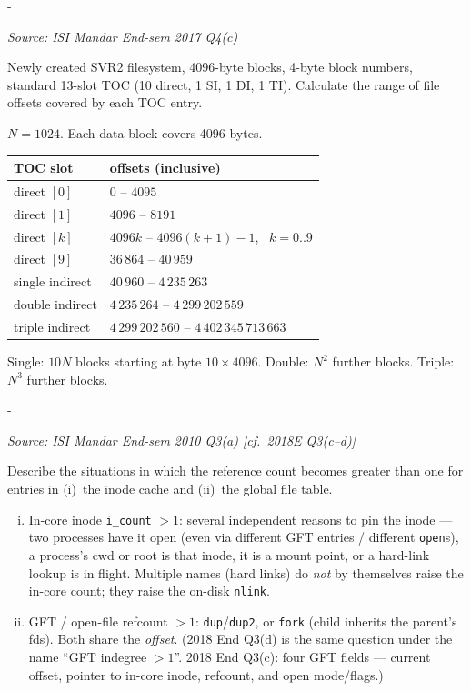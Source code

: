 \documentclass[11pt,a4paper]{article}
\makeatletter
\newcommand{\keepspace}[1]{\par\penalty-100\begingroup
  \setlength{\dimen@}{#1}\dimen@ii\pagegoal\advance\dimen@ii-\pagetotal
  \ifdim\dimen@>\dimen@ii\ifdim\dimen@ii>\z@\vfil\fi\break\fi\endgroup}
\newcounter{qn}[section]
\newenvironment{Qn}[4]{%
  \refstepcounter{qn}\keepspace{7\baselineskip}%
  \begin{tcolorbox}[qboxstyle, title={Q\thesection.\theqn\ \ [#1 \textbar\ #2]\ \ #4}]%
  {\footnotesize\color{g3}\textit{Source: #3}}\par\smallskip%
}{%
  \end{tcolorbox}%
}
\newenvironment{Sol}{%
  \begin{tcolorbox}[sboxstyle, title={Solution}]%
}{%
  \end{tcolorbox}\vspace{0.35em}%
}
\makeatother
\begin{document}
\begin{Qn}{Hard}{Lect 24}{ISI Mandar End-sem 2017 Q4(c)}{Offset ranges of each TOC entry}
Newly created SVR2 filesystem, 4096-byte blocks, 4-byte block numbers,
standard 13-slot TOC (10 direct, 1 SI, 1 DI, 1 TI). Calculate the range
of file offsets covered by each TOC entry.
\end{Qn}
\begin{Sol}
$N=1024$. Each data block covers 4096 bytes.
\begin{center}
\begin{tabular}{ll}
\hline
TOC slot & offsets (inclusive) \\
\hline
direct $[0]$ & $0$ -- $4095$ \\
direct $[1]$ & $4096$ -- $8191$ \\
direct $[k]$ & $4096k$ -- $4096(k+1)-1$, \ $k=0..9$ \\
direct $[9]$ & $36\,864$ -- $40\,959$ \\
single indirect & $40\,960$ -- $4\,235\,263$ \\
double indirect & $4\,235\,264$ -- $4\,299\,202\,559$ \\
triple indirect & $4\,299\,202\,560$ -- $4\,402\,345\,713\,663$ \\
\hline
\end{tabular}
\end{center}
Single: $10N$ blocks starting at byte $10\times 4096$.
Double: $N^{2}$ further blocks. Triple: $N^{3}$ further blocks.
\end{Sol}

\begin{Qn}{Medium-Hard}{Lect 23}{ISI Mandar End-sem 2010 Q3(a) [cf.\ 2018E Q3(c--d)]}{When do inode-cache and GFT refcounts exceed 1?}
Describe the situations in which the reference count becomes greater
than one for entries in (i)~the inode cache and (ii)~the global file
table.
\end{Qn}
\begin{Sol}
\begin{enumerate}[(i)]
\item In-core inode \texttt{i\_count} $>1$: several independent
      reasons to pin the inode --- two processes have it open (even via
      different GFT entries / different \texttt{open}s), a process's
      cwd or root is that inode, it is a mount point, or a hard-link
      lookup is in flight. Multiple names (hard links) do \emph{not}
      by themselves raise the in-core count; they raise the on-disk
      \texttt{nlink}.
\item GFT / open-file refcount $>1$: \texttt{dup}/\texttt{dup2}, or
      \texttt{fork} (child inherits the parent's fds). Both share the
      \emph{offset}. (2018 End Q3(d) is the same question under the
      name ``GFT indegree $>1$''. 2018 End Q3(c): four GFT fields ---
      current offset, pointer to in-core inode, refcount, and open
      mode/flags.)
\end{enumerate}
\end{Sol}
\end{document}
